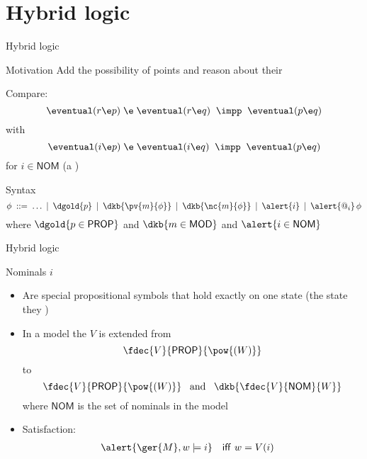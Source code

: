 \documentclass{beamer}
\begin{document}
\section{Hybrid logic}
\begin{slide}{Hybrid logic}\label{s:46}
\small

\begin{block}{Motivation}
Add the possibility of  points and reason about their 

\vspace{0.5cm}
Compare:
\begin{equation*}
\eventual (r \e p)\; \e\; \eventual (r \e q)\; \; \impp\; \; \eventual (p \e q)
\end{equation*}
with
\begin{equation*}
\eventual (i \e p)\; \e\; \eventual (i \e q)\; \; \impp\; \; \eventual (p \e q)
\end{equation*}
for $i \in \mathsf{NOM}$ (a )
\end{block}

\begin{block}{Syntax}
  \begin{equation*}
\phi\; ::=\;
    \ldots \:\mid\:
    \dgold{p} \: \mid\: 
    \dkb{\pv{m}{\phi}} \:  \mid\:
    \dkb{\nc{m}{\phi}} \:  \mid\:
    \alert{i} \:  \mid\:
    \alert{@_i}\,\phi
\end{equation*}
where $\dgold{p \in \mathsf{PROP}}$ and $\dkb{m \in \mathsf{MOD}}$ and $\alert{i \in \mathsf{NOM}}$
\end{block}
\end{slide}

\begin{slide}{Hybrid logic}\label{s:47}
\small

\begin{block}{Nominals $i$}
\begin{itemize}
\item Are special propositional symbols that hold exactly on one state (the state they )
\item  In a model the  $V$ is extended from 
$$ \fdec{V}{\mathsf{PROP}}{\pow{(W)}} $$
to
$$ \fdec{V}{\mathsf{PROP}}{\pow{(W)}} \; \; \; \text{and}\; \; \;  \dkb{\fdec{V}{\mathsf{NOM}}{W} }$$
where $\mathsf{NOM}$ is the set of nominals in the model
\item Satisfaction:
\begin{align*}
\alert{\ger{M}, w  \models  i} &&  \text{\textsf{iff} }  & w = V(i)
\end{align*}
\end{itemize}
\end{block}


\end{slide}
\end{document}
